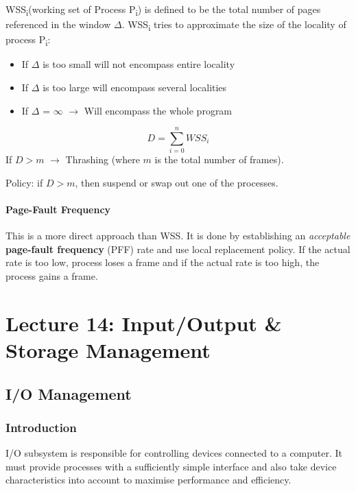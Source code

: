 \documentclass{article}%
\begin{document}
WSS\textsubscript{i}(working set of Process P\textsubscript{i}) is defined to be the total number of pages referenced in the window \(\Delta\).
WSS\textsubscript{i} tries to approximate the size of the locality of process P\textsubscript{i}:
\begin{itemize}
\item If \(\Delta\) is too small will not encompass entire locality
\item If \(\Delta\) is too large will encompass several localities
\item If \(\Delta\) = \(\infty\) \(\rightarrow\) Will encompass the whole program
\end{itemize}
\begin{equation}
D = \sum\limits_{i=0}^n WSS_i
\end{equation}
If \(D > m\) \(\rightarrow\) Thrashing (where \(m\) is the total number of frames).

Policy: if \(D > m\), then suspend or swap out one of the processes.

\paragraph{Page-Fault Frequency}
\label{sec:orge0a5dfc}
This is a more direct approach than WSS.
It is done by establishing an \emph{acceptable} \textbf{page-fault frequency} (PFF) rate and use local replacement policy.
If the actual rate is too low, process loses a frame and if the actual rate is too high, the process gains a frame.

\maketitle
\section{Lecture 14: Input/Output \& Storage Management}


\subsection{I/O Management}
\label{sec:orge22c6ee}
\subsubsection{Introduction}
\label{sec:org6d123ec}
I/O subsystem is responsible for controlling devices connected to a computer.
It must provide processes with a sufficiently simple interface and also take device characteristics into account to maximise performance and efficiency.
\end{document}
